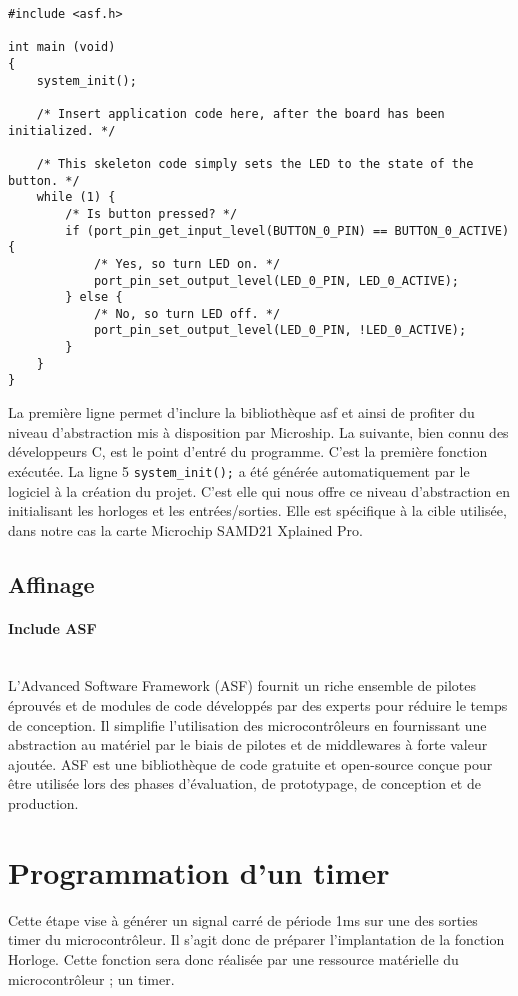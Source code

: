 \documentclass[a4paper]{article}
\begin{document}
\begin{lstlisting}[style=CStyle]
#include <asf.h>

int main (void)
{
	system_init();
	
	/* Insert application code here, after the board has been initialized. */
	
	/* This skeleton code simply sets the LED to the state of the button. */
	while (1) {
		/* Is button pressed? */
		if (port_pin_get_input_level(BUTTON_0_PIN) == BUTTON_0_ACTIVE) {
			/* Yes, so turn LED on. */
			port_pin_set_output_level(LED_0_PIN, LED_0_ACTIVE);
		} else {
			/* No, so turn LED off. */
			port_pin_set_output_level(LED_0_PIN, !LED_0_ACTIVE);
		}
	}
}
\end{lstlisting}
La première ligne permet d'inclure la  bibliothèque asf et ainsi de profiter du niveau d'abstraction mis à disposition par Microship. La suivante, bien connu des développeurs C, est le point d'entré du programme. C'est la première fonction exécutée. La ligne 5 \texttt{system\_init();} a été générée automatiquement par le logiciel à la création du projet. C'est elle qui nous offre ce niveau d'abstraction en initialisant les horloges et les entrées/sorties. Elle est spécifique à la cible utilisée, dans notre cas la carte Microchip SAMD21 Xplained Pro.

\subsection{Affinage}

\paragraph{Include ASF}
~~\\
L'Advanced Software Framework (ASF) fournit un riche ensemble de pilotes éprouvés et de modules de code développés par des experts pour réduire le temps de conception. Il simplifie l'utilisation des microcontrôleurs en fournissant une abstraction au matériel par le biais de pilotes et de middlewares à forte valeur ajoutée. ASF est une bibliothèque de code gratuite et open-source conçue pour être utilisée lors des phases d'évaluation, de prototypage, de conception et de production.


\section{Programmation d'un timer}
Cette étape vise à générer un signal carré de période 1ms sur une des sorties timer du microcontrôleur. Il s'agit donc de préparer l'implantation de la fonction Horloge. Cette fonction sera donc réalisée par une ressource matérielle du microcontrôleur ; un timer. 
{}

\end{document}
